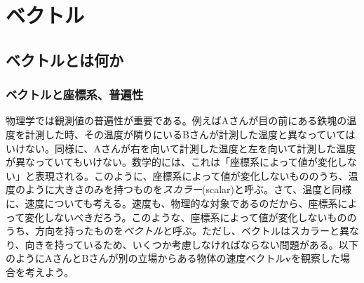 \chapter{ベクトル}
\section{ベクトルとは何か}
\subsection{ベクトルと座標系、普遍性}
物理学では観測値の普遍性が重要である。例えばAさんが目の前にある鉄塊の温度を計測した時、その温度が隣りにいるBさんが計測した温度と異なっていてはいけない。同様に、Aさんが右を向いて計測した温度と左を向いて計測した温度が異なっていてもいけない。数学的には、これは「座標系によって値が変化しない」と表現される。このように、座標系によって値が変化しないもののうち、温度のように大きさのみを持つものを\emph{スカラー}(scalar)と呼ぶ。さて、温度と同様に、速度についても考える。速度も、物理的な対象であるのだから、座標系によって変化しないべきだろう。このような、座標系によって値が変化しないもののうち、方向を持ったものを\emph{ベクトル}と呼ぶ。ただし、ベクトルはスカラーと異なり、向きを持っているため、いくつか考慮しなければならない問題がある。以下のようにAさんとBさんが別の立場からある物体の速度ベクトル\(\boldsymbol{v}\)を観察した場合を考えよう。
